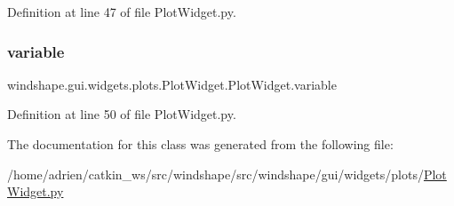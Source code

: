 Definition at line 47 of file Plot\+Widget.\+py.

\mbox{\label{classwindshape_1_1gui_1_1widgets_1_1plots_1_1_plot_widget_1_1_plot_widget_a740aa3698f6d10d8b3d352d69f890a7d}} 
\subsubsection{\texorpdfstring{variable}{variable}}
{\footnotesize\ttfamily windshape.\+gui.\+widgets.\+plots.\+Plot\+Widget.\+Plot\+Widget.\+variable}



Definition at line 50 of file Plot\+Widget.\+py.



The documentation for this class was generated from the following file\+:\begin{DoxyCompactItemize}
\item 
/home/adrien/catkin\+\_\+ws/src/windshape/src/windshape/gui/widgets/plots/\mbox{\hyperlink{_plot_widget_8py}{Plot\+Widget.\+py}}\end{DoxyCompactItemize}
